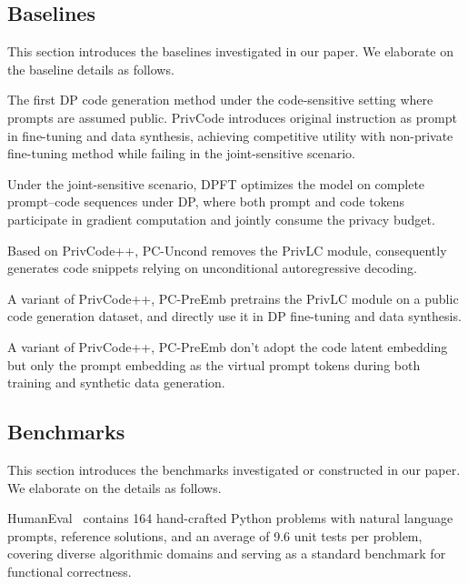 \documentclass{article}
\theoremstyle{plain}
\theoremstyle{definition}
\theoremstyle{remark}
\def \toolname{PrivCode++}
\begin{document}
{\subsection{Baselines}
\label{app:baselines_details}
This section introduces the baselines investigated in our paper. We elaborate on the baseline details as follows.

The first DP code generation method under the code-sensitive setting where prompts are assumed public. PrivCode introduces original instruction as prompt in fine-tuning and data synthesis, achieving competitive utility with non-private fine-tuning method while failing in the joint-sensitive scenario.

 Under the joint-sensitive scenario, DPFT optimizes the model on complete prompt–code sequences under DP, where both prompt and code tokens participate in gradient computation and jointly consume the privacy budget.

Based on \toolname, PC-Uncond removes the PrivLC module, consequently generates code snippets relying on unconditional autoregressive decoding.

A variant of \toolname, PC-PreEmb pretrains the PrivLC module on a public code generation dataset, and directly use it in DP fine-tuning and data synthesis.

A variant of \toolname, PC-PreEmb don't adopt the code latent embedding but only the prompt embedding as the virtual prompt tokens during both training and synthetic data generation.




\subsection{Benchmarks}
\label{app:benchmarks_details}

This section introduces the benchmarks investigated or constructed in our paper. We elaborate on the details as follows.

 HumanEval~\cite{chen2021evaluating} contains 164 hand-crafted Python problems with natural language prompts, reference solutions, and an average of 9.6 unit tests per problem, covering diverse algorithmic domains and serving as a standard benchmark for functional correctness. 

}
\end{document}
